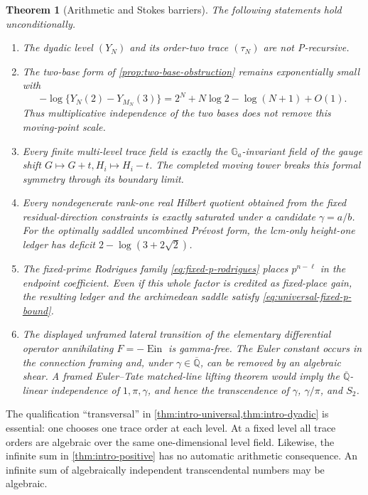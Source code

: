 \documentclass[11pt]{article}
\newtheorem{theorem}{Theorem}[section]
\theoremstyle{definition}
\theoremstyle{remark}
\newcommand{\Qbar}{\overline{\mathbb Q}}
\newcommand{\Ein}{\operatorname{Ein}}
\begin{document}
\begin{theorem}[Arithmetic and Stokes barriers]
\label{thm:intro-new-barriers}
The following statements hold unconditionally.
\begin{enumerate}[label=\textup{(\roman*)}]
 \item The dyadic level \((Y_N)\) and its order-two trace \((\tau_N)\) are
 not P-recursive.
 \item The two-base form of \cref{prop:two-base-obstruction} remains
 exponentially small with
 \[
  -\log\{Y_N(2)-Y_{M_N}(3)\}
  =2^N+N\log2-\log(N+1)+O(1).
 \]
 Thus multiplicative independence of the two bases does not remove this
 moving-point scale.
 \item Every finite multi-level trace field is exactly the
 \(\mathbb G_a\)-invariant field of the gauge shift
 \(G\mapsto G+t,H_i\mapsto H_i-t\).  The completed moving tower breaks this
 formal symmetry through its boundary limit.
 \item Every nondegenerate rank-one real Hilbert quotient obtained from the
 fixed residual-direction constraints is exactly saturated under a candidate
 \(\gamma=a/b\).  For the optimally saddled uncombined Pr\'evost form, the
 lcm-only height-one ledger has deficit
 \(2-\log(3+2\sqrt2)\).
 \item The fixed-prime Rodrigues family \eqref{eq:fixed-p-rodrigues}
 places \(p^{n-\ell}\) in the endpoint coefficient.  Even if this whole
 factor is credited as fixed-place gain, the resulting ledger and the
 archimedean saddle satisfy \eqref{eq:universal-fixed-p-bound}.
 \item The displayed unframed lateral transition of the elementary
 differential operator annihilating \(F=-\Ein\) is gamma-free.  The Euler
 constant occurs in the connection framing and, under
 \(\gamma\in\Qbar\), can be removed by an algebraic shear.  A framed
 Euler--Tate matched-line lifting theorem would imply the
 \(\Qbar\)-linear independence of \(1,\pi,\gamma\), and hence the
 transcendence of \(\gamma\), \(\gamma/\pi\), and \(S_2\).
\end{enumerate}
\end{theorem}

The qualification ``transversal'' in
\cref{thm:intro-universal,thm:intro-dyadic} is essential: one chooses one
trace order at each level.  At a fixed level all trace orders are algebraic
over the same one-dimensional level field.  Likewise, the infinite sum in
\cref{thm:intro-positive} has no automatic arithmetic consequence.  An
infinite sum of algebraically independent transcendental numbers may be
algebraic.
\end{document}
